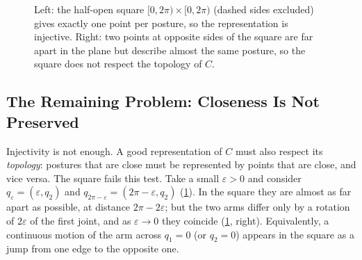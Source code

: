 \begin{figure}[ht]
{}
    \caption{Left: the half-open square $[0,2\pi)\times[0,2\pi)$ (dashed
    sides excluded) gives exactly one point per posture, so the
    representation is injective. Right: two points at opposite sides of the
    square are far apart in the plane but describe almost the same posture, so
    the square does not respect the topology of $C$.}
    \label{fig:cspace-torus-square}
\end{figure}

\subsection{The Remaining Problem: Closeness Is Not Preserved}
\label{subsec:cspace-closeness}

Injectivity is not enough. A good representation of \( C \)
must also respect its \emph{topology}: postures that are close must be
represented by points that are close, and vice versa. The square fails
this test. Take a small \( \varepsilon > 0 \) and consider
\( q_\varepsilon = (\varepsilon, q_2) \) and
\( q_{2\pi-\varepsilon} = (2\pi - \varepsilon, q_2) \)
(\cref{fig:cspace-torus-square}). In the square they are almost as far
apart as possible, at distance \( 2\pi - 2\varepsilon \); but the two
arms differ only by a rotation of \( 2\varepsilon \) of the first joint,
and as \( \varepsilon \to 0 \) they coincide (\cref{fig:cspace-torus-square},
right). Equivalently, a continuous motion of the arm across
\( q_1 = 0 \) (or \( q_2 = 0 \)) appears in the square as a jump from one
edge to the opposite one.

